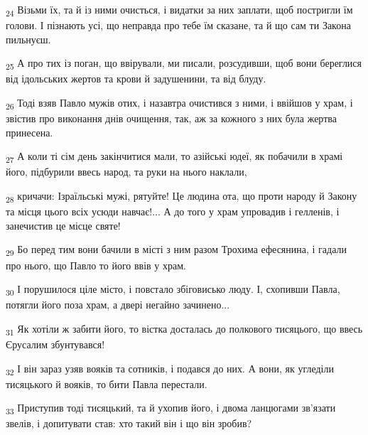 \begin{tcolorbox}
\textsubscript{24} Візьми їх, та й із ними очисться, і видатки за них заплати, щоб постригли їм голови. І пізнають усі, що неправда про тебе їм сказане, та й що сам ти Закона пильнуєш.
\end{tcolorbox}
\begin{tcolorbox}
\textsubscript{25} А про тих із поган, що ввірували, ми писали, розсудивши, щоб вони береглися від ідольських жертов та крови й задушенини, та від блуду.
\end{tcolorbox}
\begin{tcolorbox}
\textsubscript{26} Тоді взяв Павло мужів отих, і назавтра очистився з ними, і ввійшов у храм, і звістив про виконання днів очищення, так, аж за кожного з них була жертва принесена.
\end{tcolorbox}
\begin{tcolorbox}
\textsubscript{27} А коли ті сім день закінчитися мали, то азійські юдеї, як побачили в храмі його, підбурили ввесь народ, та руки на нього наклали,
\end{tcolorbox}
\begin{tcolorbox}
\textsubscript{28} кричачи: Ізраїльські мужі, рятуйте! Це людина ота, що проти народу й Закону та місця цього всіх усюди навчає!... А до того у храм упровадив і гелленів, і занечистив це місце святе!
\end{tcolorbox}
\begin{tcolorbox}
\textsubscript{29} Бо перед тим вони бачили в місті з ним разом Трохима ефесянина, і гадали про нього, що Павло то його ввів у храм.
\end{tcolorbox}
\begin{tcolorbox}
\textsubscript{30} І порушилося ціле місто, і повстало збіговисько люду. І, схопивши Павла, потягли його поза храм, а двері негайно зачинено...
\end{tcolorbox}
\begin{tcolorbox}
\textsubscript{31} Як хотіли ж забити його, то вістка досталась до полкового тисяцього, що ввесь Єрусалим збунтувався!
\end{tcolorbox}
\begin{tcolorbox}
\textsubscript{32} І він зараз узяв вояків та сотників, і подався до них. А вони, як угледіли тисяцького й вояків, то бити Павла перестали.
\end{tcolorbox}
\begin{tcolorbox}
\textsubscript{33} Приступив тоді тисяцький, та й ухопив його, і двома ланцюгами зв'язати звелів, і допитувати став: хто такий він і що він зробив?
\end{tcolorbox}
